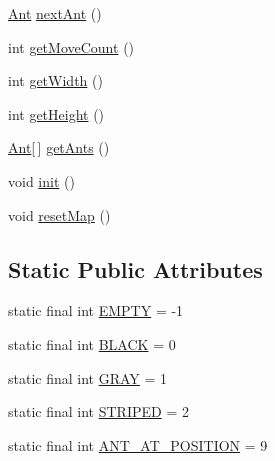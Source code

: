\begin{DoxyCompactItemize}
\item 
\hyperlink{classexamples_1_1gp_1_1painted_desert_1_1_ant}{Ant} \hyperlink{classexamples_1_1gp_1_1painted_desert_1_1_ant_map_a0eee6ab93fe62810236695b022a68e61}{next\-Ant} ()
\item 
int \hyperlink{classexamples_1_1gp_1_1painted_desert_1_1_ant_map_aa431d59f37bd4596e31af682beb22fe7}{get\-Move\-Count} ()
\item 
int \hyperlink{classexamples_1_1gp_1_1painted_desert_1_1_ant_map_a3f267aae1f0c060a1a5db2cb1b27bc22}{get\-Width} ()
\item 
int \hyperlink{classexamples_1_1gp_1_1painted_desert_1_1_ant_map_abefbd714aff019a3068d901223171771}{get\-Height} ()
\item 
\hyperlink{classexamples_1_1gp_1_1painted_desert_1_1_ant}{Ant}\mbox{[}$\,$\mbox{]} \hyperlink{classexamples_1_1gp_1_1painted_desert_1_1_ant_map_a8f3458131a74e8c74f465720ec118e62}{get\-Ants} ()
\item 
void \hyperlink{classexamples_1_1gp_1_1painted_desert_1_1_ant_map_ac62a8b1c0ca10639ad9e02b207b45274}{init} ()
\item 
void \hyperlink{classexamples_1_1gp_1_1painted_desert_1_1_ant_map_a29bd145c0f00792b34591f3894251c75}{reset\-Map} ()
\end{DoxyCompactItemize}
\subsection*{Static Public Attributes}
\begin{DoxyCompactItemize}
\item 
static final int \hyperlink{classexamples_1_1gp_1_1painted_desert_1_1_ant_map_a615af6a550b5cc40655f383d6f7ee97e}{E\-M\-P\-T\-Y} = -\/1
\item 
static final int \hyperlink{classexamples_1_1gp_1_1painted_desert_1_1_ant_map_a93de6de82fae66c7bf8423d40669ece8}{B\-L\-A\-C\-K} = 0
\item 
static final int \hyperlink{classexamples_1_1gp_1_1painted_desert_1_1_ant_map_ac514259c0de4809ffc65dbdbddc0c9f6}{G\-R\-A\-Y} = 1
\item 
static final int \hyperlink{classexamples_1_1gp_1_1painted_desert_1_1_ant_map_a06515b627b9763787dd76324bd151d73}{S\-T\-R\-I\-P\-E\-D} = 2
\item 
static final int \hyperlink{classexamples_1_1gp_1_1painted_desert_1_1_ant_map_a261d8f6c6336a40455682b2cc4a03924}{A\-N\-T\-\_\-\-A\-T\-\_\-\-P\-O\-S\-I\-T\-I\-O\-N} = 9
\end{DoxyCompactItemize}
